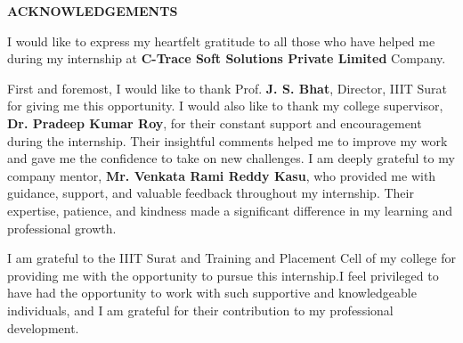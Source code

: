 \thispagestyle{plain}

\begin{center}
 \Large {\bf \uppercase{Acknowledgements}}
\end{center}

\vspace{3\baselineskip}

\justify
\noindent
I would like to express my heartfelt gratitude to all those who have helped me during my internship at \textbf{C-Trace Soft Solutions Private Limited} Company.

First and foremost, I would like to thank Prof. \textbf{J. S. Bhat}, Director, IIIT Surat for giving me this opportunity. I would also like to thank my college supervisor, \textbf{Dr. Pradeep Kumar Roy}, for their constant support and encouragement during the internship. Their insightful comments helped me to improve my work and gave me the confidence to take on new challenges. I am deeply grateful to my company mentor,\textbf{ Mr. Venkata Rami Reddy Kasu}, who provided me with guidance, support, and valuable feedback throughout my internship. Their expertise, patience, and kindness made a significant difference in my learning and professional growth.

I am grateful to the IIIT Surat and Training and Placement Cell of my college for providing me with the opportunity to pursue this internship.I feel privileged to have had the opportunity to work with such supportive and knowledgeable individuals, and I am grateful for their contribution to my professional development.


 
